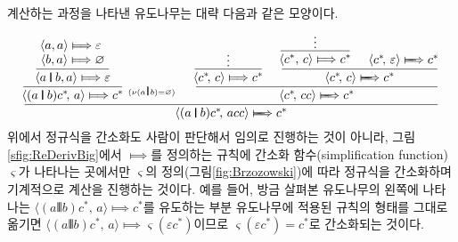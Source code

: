 계산하는 과정을 나타낸 유도나무는 대략 다음과 같은 모양이다.
\vspace*{-2.5ex}
\[%
\setpremisesend{-.25ex}
\inference{
  \inference*{
    \inference{
      \langle a,a\rangle \Longmapsto \varepsilon~ \\
      \langle b,a\rangle \Longmapsto \varnothing
    }{\langle a\VERT b,a\rangle \Longmapsto \varepsilon}
  }{
  \langle(a\VERT b)c^{*}\!,\,a\rangle \Longmapsto c^{*}
  }
& \text{\hspace{-2ex}\small$\!^{(\nu(a\!\VERT\!b)=\varnothing)}$}
& \inference{
    \inference*{\vdots}{
    \langle c^{*}\!,\,c\rangle \Longmapsto c^{*}
    }
  & \inference{
      \inference*{\vdots}{
      \langle c^{*},\,c\rangle \Longmapsto c^{*}
      }
    & \langle c^{*}\!,\,\varepsilon\rangle \LONGmapsto c^{*}
    }{
    \langle c^{*}\!,\,c\rangle \LONGmapsto c^{*}
    }
  }{
  \langle c^{*}\!,\,cc\rangle \LONGmapsto c^{*}
  }
}{
\langle(a\VERT b)c^{*}\!,\,acc\rangle \LONGmapsto c^{*}
}\vspace{-.5ex}
\]
위에서 정규식을 간소화도 사람이 판단해서 임의로 진행하는 것이 아니라,
그림\;\ref{sfig:ReDerivBig}에서 $\Longmapsto$를 정의하는 규칙에
간소화 함수(simplification function) $\varsigma$가 나타나는 곳에서만
$\varsigma$의 정의(그림\;\ref{fig:Brzozowski})에 따라 정규식을
간소화하며 기계적으로 계산을 진행하는 것이다. 예를 들어,
방금 살펴본 유도나무의 왼쪽에 나타나는
$\langle(a\VERT b)c^{*}\!,\,a\rangle \Longmapsto c^{*}$를
유도하는 부분 유도나무에 적용된 규칙의 형태를 그대로 옮기면
$\langle(a\VERT b)c^{*}\!,\,a\rangle
 \Longmapsto \varsigma(\varepsilon c^{*})$이므로
$\varsigma(\varepsilon c^{*}) = c^{*}$로 간소화되는 것이다.

